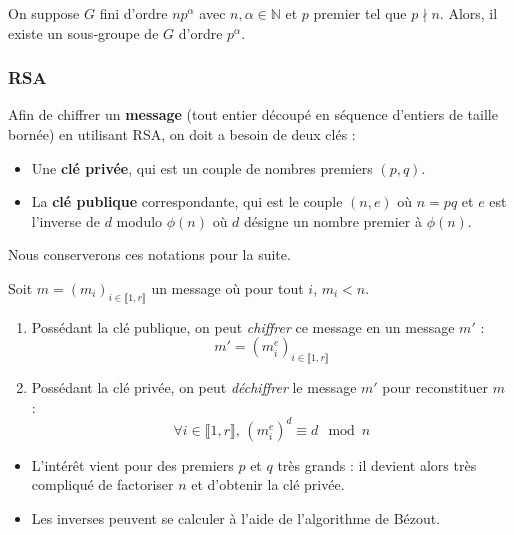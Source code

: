   \begin{application}
    On suppose $G$ fini d'ordre $n p^\alpha$ avec $n, \alpha \in \mathbb{N}$ et $p$ premier tel que $p \nmid n$. Alors, il existe un sous-groupe de $G$ d’ordre $p^\alpha$.
  \end{application}

  \subsubsection{RSA}


  \begin{definition}
    Afin de chiffrer un \textbf{message} (tout entier découpé en séquence d'entiers de taille bornée) en utilisant RSA, on doit a besoin de deux clés :
    \begin{itemize}
      \item Une \textbf{clé privée}, qui est un couple de nombres premiers $(p,q)$.
      \item La \textbf{clé publique} correspondante, qui est le couple $(n,e)$ où $n = pq$ et $e$ est l'inverse de $d$ modulo $\phi(n)$ où $d$ désigne un nombre premier à $\phi(n)$.
    \end{itemize}
  \end{definition}

  Nous conserverons ces notations pour la suite.

  \begin{theorem}
    Soit $m = (m_i)_{i \in \llbracket 1, r \rrbracket}$ un message où pour tout $i$, $m_i < n$.
    \begin{enumerate}[label=(\roman*)]
      \item Possédant la clé publique, on peut \textit{chiffrer} ce message en un message $m'$ :
      \[ m' = (m_i^e)_{i \in \llbracket 1, r \rrbracket} \]
      \item Possédant la clé privée, on peut \textit{déchiffrer} le message $m'$ pour reconstituer $m$ :
      \[ \forall i \in \llbracket 1, r \rrbracket, \, (m_i^e)^d \equiv d \mod n \]
    \end{enumerate}
  \end{theorem}

  \begin{remark}
    \begin{itemize}
      \item L'intérêt vient pour des premiers $p$ et $q$ très grands : il devient alors très compliqué de factoriser $n$ et d'obtenir la clé privée.
      \item Les inverses peuvent se calculer à l'aide de l'algorithme de Bézout.
    \end{itemize}
  \end{remark}

